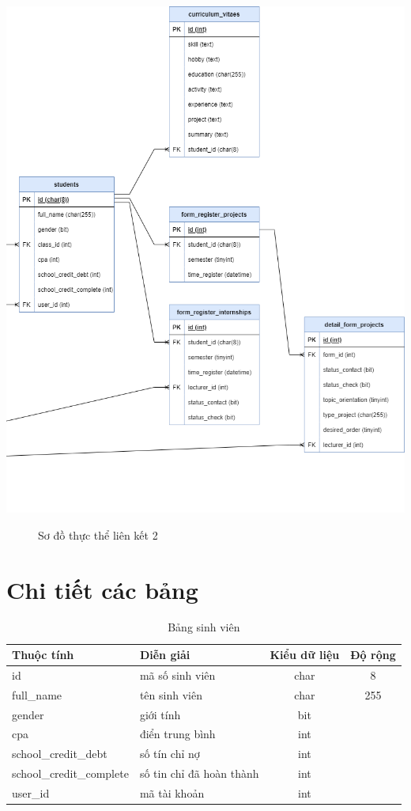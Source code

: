     \begin{center}
      \includegraphics[width=1.1\textwidth]{../drawio/db_sv3.png}
      \begin{figure}[h]
        \centering
        \caption{Sơ đồ thực thể liên kết 2}
      \end{figure}
    \end{center}

\section{Chi tiết các bảng}
    \begin{table}[h!]
      \centering
      \begin{tabular}{|l|p{}|c|c|}
        \hline
        \textbf{Thuộc tính} & \textbf{Diễn giải} & \textbf{Kiểu dữ liệu} & \textbf{Độ rộng} \\
        \hline
        id & mã số sinh viên & char & 8 \\
        \hline
        full\_name & tên sinh viên & char & 255 \\
        \hline
        gender & giới tính & bit & \\
        \hline
        cpa & điển trung bình & int & \\
        \hline
        school\_credit\_debt & số tín chỉ nợ & int & \\
        \hline
        school\_credit\_complete & số tin chỉ đã hoàn thành & int & \\
        \hline
        user\_id & mã tài khoản & int & \\
        \hline
      \end{tabular}
      \caption{Bảng sinh viên}
    \end{table}

